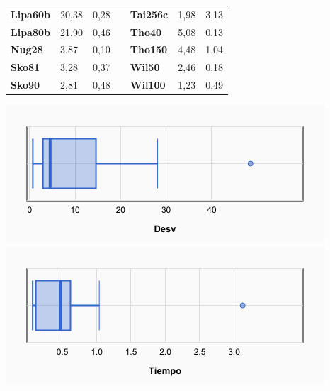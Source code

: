 \documentclass[a4paper, 12pt]{article}
\begin{document}
\begin{table}[H]
\begin{tabular}{|l|l|l|l|l|l|l|}
\textbf{Lipa60b}                    & 20,38                              & 0,28                                 &                                & \textbf{Tai256c}                   & 1,98                               & 3,13                                 \\ \cline{1-3} \cline{5-7} 
\textbf{Lipa80b}                    & 21,90                              & 0,46                                 &                                & \textbf{Tho40}                     & 5,08                               & 0,13                                 \\ \cline{1-3} \cline{5-7} 
\textbf{Nug28}                      & 3,87                               & 0,10                                 &                                & \textbf{Tho150}                    & 4,48                               & 1,04                                 \\ \cline{1-3} \cline{5-7} 
\textbf{Sko81}                      & 3,28                               & 0,37                                 &                                & \textbf{Wil50}                     & 2,46                               & 0,18                                 \\ \cline{1-3} \cline{5-7} 
\textbf{Sko90}                      & 2,81                               & 0,48                                 &                                & \textbf{Wil100}                    & 1,23                               & 0,49                                 \\ \cline{1-3} \cline{5-7} 
\end{tabular}
\end{table}

\begin{center}
         \includegraphics[scale=0.42]{boxplot-agepos-desv}
         \includegraphics[scale=0.42]{boxplot-agepos-time}
      \end{center}
      
\end{document}
